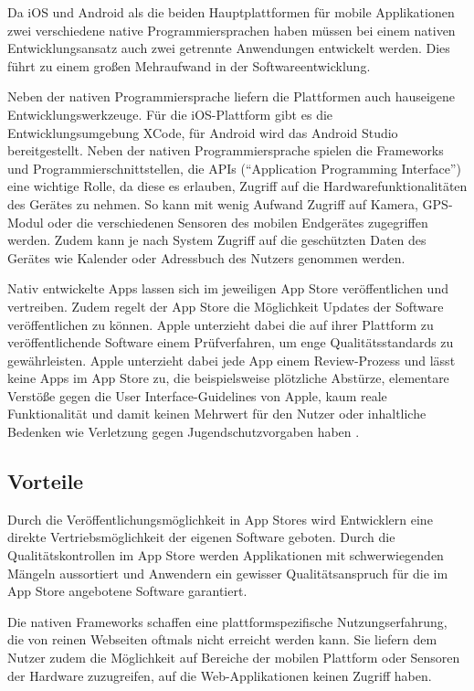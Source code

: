 Da iOS und Android als die beiden Hauptplattformen für mobile Applikationen zwei verschiedene native Programmiersprachen haben müssen bei einem nativen Entwicklungsansatz auch zwei getrennte Anwendungen entwickelt werden. Dies führt zu einem großen Mehraufwand in der Softwareentwicklung.

Neben der nativen Programmiersprache liefern die Plattformen auch hauseigene Entwicklungswerkzeuge. Für die iOS-Plattform gibt es die Entwicklungsumgebung XCode, für Android wird das Android Studio bereitgestellt. Neben der nativen Programmiersprache spielen die Frameworks und Programmierschnittstellen, die APIs (\enquote{Application Programming Interface}) eine wichtige Rolle, da diese es erlauben, Zugriff auf die Hardwarefunktionalitäten des Gerätes zu nehmen. So kann mit wenig Aufwand Zugriff auf Kamera, GPS-Modul oder die verschiedenen Sensoren des mobilen Endgerätes zugegriffen werden. Zudem kann je nach System Zugriff auf die geschützten Daten des Gerätes wie Kalender oder Adressbuch des Nutzers genommen werden. 

Nativ entwickelte Apps lassen sich im jeweiligen App Store veröffentlichen und vertreiben. Zudem regelt der App Store die Möglichkeit Updates der Software veröffentlichen zu können. Apple unterzieht dabei die auf ihrer Plattform zu veröffentlichende Software einem Prüfverfahren, um enge Qualitätsstandards zu gewährleisten. Apple unterzieht dabei jede App einem Review-Prozess und lässt keine Apps im App Store zu, die beispielsweise plötzliche Abstürze, elementare Verstöße gegen die User Interface-Guidelines von Apple, kaum reale Funktionalität und damit keinen Mehrwert für den Nutzer oder inhaltliche Bedenken wie Verletzung gegen Jugendschutzvorgaben haben \cite{appleReview}.
%
\subsection{Vorteile}
%
Durch die Veröffentlichungsmöglichkeit in App Stores wird Entwicklern eine direkte Vertriebsmöglichkeit der eigenen Software geboten. Durch die Qualitätskontrollen im App Store werden Applikationen mit schwerwiegenden Mängeln aussortiert und Anwendern ein gewisser Qualitätsanspruch für die im App Store angebotene Software garantiert.

Die nativen Frameworks schaffen eine plattformspezifische Nutzungserfahrung, die von reinen Webseiten oftmals nicht erreicht werden kann. Sie liefern dem Nutzer zudem die Möglichkeit auf Bereiche der mobilen Plattform oder Sensoren der Hardware zuzugreifen, auf die Web-Applikationen keinen Zugriff haben.

